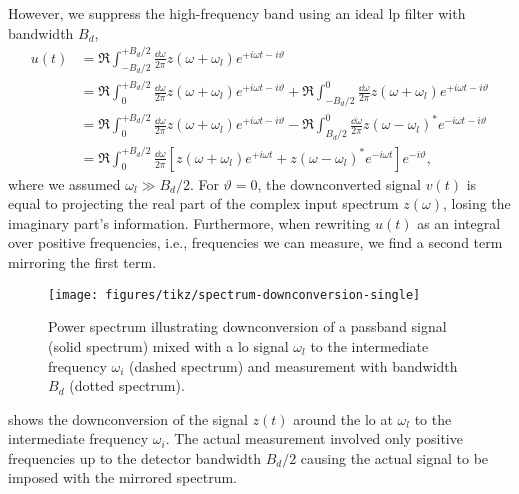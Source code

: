 However, we suppress the high-frequency band using an ideal \gls{lp} filter with bandwidth $B_d$,
\begin{equation}
	\begin{split}
		u(t)
		&=
		\Re
		\int_{-B_d/2}^{+B_d/2}\frac{\dd{\omega}}{2\pi}
		z(\omega+\omega_l)
		e^{+i\omega t-i\vartheta}
		\\
		&=
		\Re
		\int_{0}^{+B_d/2}\frac{\dd{\omega}}{2\pi}
		z(\omega+\omega_l)
		e^{+i\omega t-i\vartheta}
		+
		\Re
		\int_{-B_d/2}^{0}\frac{\dd{\omega}}{2\pi}
		z(\omega+\omega_l)
		e^{+i\omega t-i\vartheta}
		\\
		&=
		\Re
		\int_{0}^{+B_d/2}\frac{\dd{\omega}}{2\pi}
		z(\omega+\omega_l)
		e^{+i\omega t-i\vartheta}
		-
		\Re
		\int_{B_d/2}^{0}\frac{\dd{\omega}}{2\pi}
		z(\omega-\omega_l)^*
		e^{-i\omega t-i\vartheta}
		\\
		&=
		\Re
		\int_{0}^{+B_d/2}\frac{\dd{\omega}}{2\pi}
		\left[
			z(\omega+\omega_l)
			e^{+i\omega t}
			+
			z(\omega-\omega_l)^*
			e^{-i\omega t}
		\right]
		e^{-i\vartheta}
		,
	\end{split}
	\label{eq:downconversion_real}
\end{equation}
where we assumed $\omega_l\gg B_d/2$.
For $\vartheta=0$, the downconverted signal $v(t)$ is equal to projecting the real part of the complex input spectrum $z(\omega)$, losing the imaginary part's information.
Furthermore, when rewriting $u(t)$ as an integral over positive frequencies, i.e., frequencies we can measure, we find a second term mirroring the first term.
\begin{figure}[htb]
	\centering
	\texttt{[image: figures/tikz/spectrum-downconversion-single]}
	\caption{Power spectrum illustrating downconversion of a passband signal (solid spectrum) mixed with a \gls{lo} signal $\omega_l$ to the intermediate frequency $\omega_i$ (dashed spectrum) and measurement with bandwidth $B_d$ (dotted spectrum).}\label{fig:spectrum_downconversion_single}
\end{figure}
 shows the downconversion of the signal $z(t)$ around the \gls{lo} at $\omega_l$ to the intermediate frequency $\omega_i$.
The actual measurement involved only positive frequencies up to the detector bandwidth $B_d/2$ causing the actual signal to be imposed with the mirrored spectrum.

